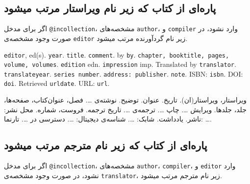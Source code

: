 \documentclass[a4paper,11pt]{article}
\begin{document}
\subsection{پاره‌ای از کتاب که زیر نام ویراستار مرتب میشود}
اگر برای مدخل \verb|@incollection|، مشخصه‌های \verb|author|، و \verb|compiler| وارد نشود، در صورت وجود مشخصه‌ی \verb|editor| زیر نام گردآورنده مرتب میشود.

\begin{itemize}[nosep]
\begin{latin}
\item[] []
{\tt editor}, ed(s). {\tt year}. {\tt title}. {\tt comment}. by {\tt by}. {\tt chapter, booktitle, pages, volume, volumes}. {\tt edition} edn. {\tt impression} imp. Translated by {\tt translator}. {\tt translateyear}. {\tt series number}. {\tt address: publisher}. {\tt note}. ISBN: {\tt isbn}. DOI: {\tt doi}. Retrieved {\tt urldate}. URL: {\tt url}. 
\end{latin}

\item[] []
{\persianttfamily ویراستار}، ویراستار(ان). {\persianttfamily تاریخ}. {\persianttfamily عنوان}. {\persianttfamily توضیح}. نوشته‌ی {\persianttfamily …}. {\persianttfamily فصل، عنوان‌کتاب، صفحه‌ها، جلد، جلدها}. ویرایش {\persianttfamily …}. چاپ {\persianttfamily …}. ترجمه‌ی {\persianttfamily …}. {\persianttfamily تاریخ ترجمه}. {\persianttfamily فروست، شماره}. {\persianttfamily محل نشر: ناشر}. {\persianttfamily یادداشت}. شابک: {\persianttfamily …}. شناسه‌ی دیجیتال: {\persianttfamily …}. دسترسی در {\persianttfamily …}. تارنما: {\persianttfamily …}. 
\end{itemize}





\subsection{پاره‌ای از کتاب که زیر نام مترجم مرتب میشود}
اگر برای مدخل \verb|@incollection|، مشخصه‌های \verb|author|، \verb|compiler|، و \verb|editor| وارد نشود، در صورت وجود مشخصه‌ی \verb|translator|، زیر نام مترجم مرتب میشود.
\end{document}
